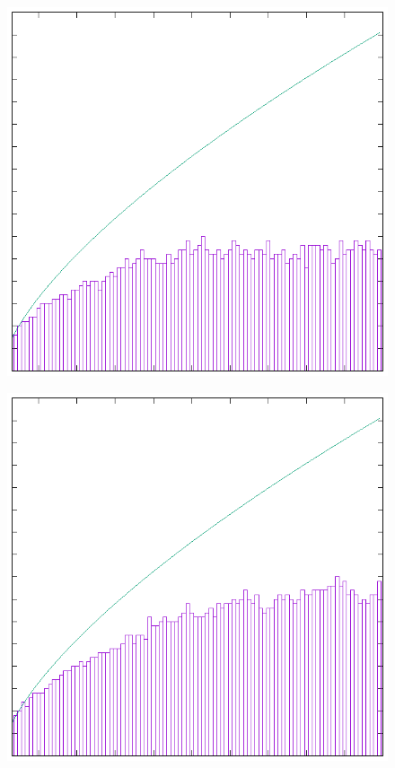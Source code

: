 \documentclass[a4paper]{article}
\begin{document}
\begin{figure}
  \includegraphics{largestSize_10000}
  \caption{}
  \label{}
\end{figure}

\begin{figure}
  \includegraphics{largestSize_100000}
  \caption{}
  \label{}
\end{figure}
\end{document}
